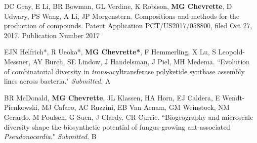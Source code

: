 
\begin{cvpubs}

\cvpub
{DC Gray, E Li, BR Bowman, GL Verdine, K Robison, \textbf{MG Chevrette}, D Udwary, PS Wang, A Li, JP Morgenstern. Compositions and methods for the production of compounds. Patent Application PCT/US2017/058800, filed Oct 27, 2017. Publication Number  \textbf{\textit{}}}
{2017}

\end{cvpubs}


\begin{cvpubs}

\cvpub
{EJN Helfrich*, R Ueoka*, \textbf{MG Chevrette*}, F Hemmerling, X Lu, S Leopold-Messner, AY Burch, SE Lindow, J Handelsman, J Piel, MH Medema. ``Evolution of combinatorial diversity in \textit{trans}-acyltransferase polyketide synthase assembly lines across bacteria." \textit{Submitted.}}
{A}

\cvpub
{BR McDonald, \textbf{MG Chevrette}, JL Klassen, HA Horn, EJ Caldera, E Wendt-Pienkowski, MJ Cafaro, AC Ruzzini, EB Van Arnam, GM Weinstock, NM Gerardo, M Poulsen, G Suen, J Clardy, CR Currie. ``Biogeography and microscale diversity shape the biosynthetic potential of fungus-growing ant-associated \textit{Pseudonocardia}." \textit{Submitted. \textbf{}}}
{B}

\end{cvpubs}


